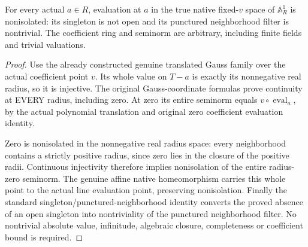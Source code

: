 \begin{theorem}
\label{scheme:actual-native-line-evaluation-nonisolation}
\leanok
{}
For every actual $a\in R$, evaluation at $a$ in the true native
fixed-$v$ space of $\mathbb A^1_R$ is nonisolated: its singleton
is not open and its punctured neighborhood filter is nontrivial.
The coefficient ring and seminorm are arbitrary, including finite
fields and trivial valuations.
\end{theorem}
\begin{proof}
Use the already constructed genuine translated Gauss family over
the actual coefficient point $v$. Its whole value on $T-a$ is
exactly its nonnegative real radius, so it is injective. The
original Gauss-coordinate formulas prove continuity at EVERY
radius, including zero. At zero its entire seminorm equals
$v\circ\operatorname{eval}_a$, by the actual polynomial
translation and original zero coefficient evaluation identity.

Zero is nonisolated in the nonnegative real radius space: every
neighborhood contains a strictly positive radius, since zero lies
in the closure of the positive radii. Continuous injectivity
therefore implies nonisolation of the entire radius-zero seminorm.
The genuine affine native homeomorphism carries this whole point
to the actual line evaluation point, preserving nonisolation.
Finally the standard singleton/punctured-neighborhood identity
converts the proved absence of an open singleton into nontriviality
of the punctured neighborhood filter. No nontrivial absolute value,
infinitude, algebraic closure, completeness or coefficient bound
is required.
\end{proof}

